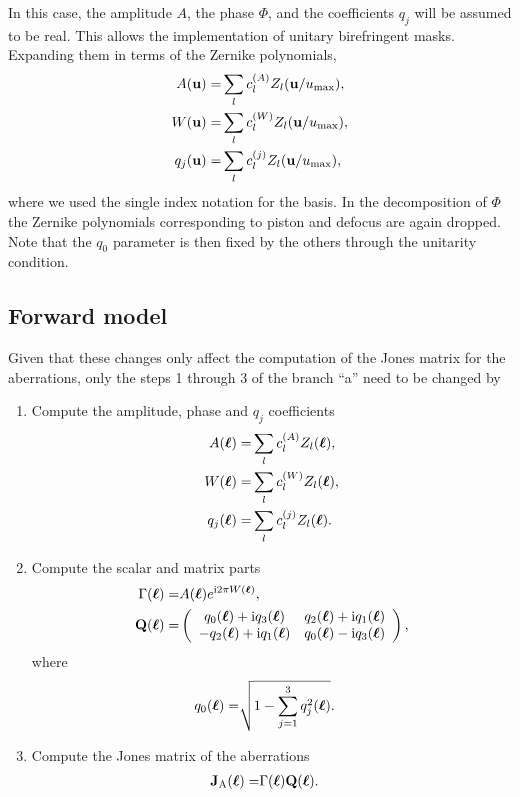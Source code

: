\documentclass[reprint,aps,pra,superscriptaddress,
amsmath,amssymb]{revtex4-1}
\begin{document}
In this case, the amplitude $A$, the phase $\Phi $, and the coefficients $q_j$ will be assumed to be real. This allows the implementation of unitary birefringent masks.  Expanding  them in terms of the Zernike polynomials,
\begin{align}
A (\textbf u) = &\sum_l c_{l}^{(A)}Z_l(\textbf u/u_\text{max}) ,\\
W(\textbf u) = &\sum_l c_{l}^{(W)}Z_l(\textbf u/u_\text{max}) ,\\
q_{j} (\textbf u) = &\sum_l c_{l}^{(j)}Z_l(\textbf u/u_\text{max}),
\end{align}
where we used the single index notation for the basis. In the decomposition of  $\Phi$ the Zernike polynomials corresponding to piston and defocus are again  dropped. Note that the $q_0$ parameter is then fixed by the others through the unitarity condition.

\subsection{Forward model}

Given that these changes only affect the computation of the Jones matrix for the aberrations, only the steps 1 through 3 of the branch ``a'' need to be changed by
\begin{enumerate}
\item Compute the amplitude, phase and $q_j$ coefficients
\begin{align*}
A (\boldsymbol \ell) = &\sum_l c_{l}^{(A)}Z_l(\boldsymbol \ell) ,\\
W(\boldsymbol \ell) = &\sum_l c_{l}^{(W)}Z_l(\boldsymbol \ell) ,\\
q_{j} (\boldsymbol \ell) = &\sum_l c_{l}^{(j)}Z_l(\boldsymbol \ell).
\end{align*}
\item Compute the scalar and matrix parts
\begin{align*}
 \Gamma (\boldsymbol \ell)  = &A(\boldsymbol \ell)  e^{\text{i} 2 \pi  W (\boldsymbol \ell)  },\\
\textbf Q (\boldsymbol \ell) = & \left(
\begin{array}{cc}
q_0 (\boldsymbol \ell)  + \text{i} q_3 (\boldsymbol \ell) & q_2(\boldsymbol \ell) + \text{i} q_1(\boldsymbol \ell)   \\
-q_2 (\boldsymbol \ell) + \text{i} q_1 (\boldsymbol \ell)  & q_0(\boldsymbol \ell) - \text{i} q_3(\boldsymbol \ell) 
\end{array}
\right) ,
\end{align*}
where
\begin{align*}
q_0 (\boldsymbol \ell)  = & \sqrt{1-\sum_{j=1}^3 q_j^2(\boldsymbol \ell)}.
\end{align*}
\item Compute the Jones matrix of the aberrations
\begin{align*}
\textbf J_\text{A}(\boldsymbol \ell) 
=& \Gamma (\boldsymbol \ell) \textbf Q (\boldsymbol \ell).
\end{align*}
\end{enumerate}
\end{document}

